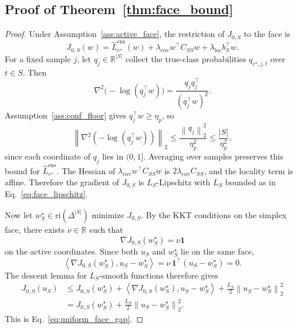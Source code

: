 \documentclass{article}
\theoremstyle{definition}
\newcommand{\RR}{\mathbb{R}}
\newcommand{\one}{\mathbf{1}}
\newcommand{\simplex}{\Delta}
\newcommand{\norm}[1]{\left\lVert #1 \right\rVert}
\newcommand{\inner}[2]{\left\langle #1, #2 \right\rangle}
\begin{document}
\subsection{Proof of Theorem~\ref{thm:face_bound}}

\begin{proof}
Under Assumption~\ref{ass:active_face}, the restriction of \(J_{0,S}\) to the face is
\[
J_{0,S}(w)=\widehat L_{e^\star}^{\mathrm{ens}}(w)+\lambda_{\mathrm{cov}}w^\top C_{SS}w+\lambda_{\mathrm{loc}}b_S^\top w.
\]
For a fixed sample \(j\), let \(q_j\in\RR^{|S|}\) collect the true-class probabilities \(q_{e^\star,j,t}\) over \(t\in S\). Then
\[
\nabla^2\!\big(-\log(q_j^\top w)\big)=\frac{q_j q_j^\top}{(q_j^\top w)^2}.
\]
Assumption~\ref{ass:conf_floor} gives \(q_j^\top w\ge \eta_p\), so
\[
\norm{\nabla^2(-\log(q_j^\top w))}_2 \le \frac{\norm{q_j}_2^2}{\eta_p^2}\le \frac{|S|}{\eta_p^2},
\]
since each coordinate of \(q_j\) lies in \((0,1]\). Averaging over samples preserves this bound for \(\widehat L_{e^\star}^{\mathrm{ens}}\). The Hessian of \(\lambda_{\mathrm{cov}}w^\top C_{SS}w\) is \(2\lambda_{\mathrm{cov}}C_{SS}\), and the locality term is affine. Therefore the gradient of \(J_{0,S}\) is \(L_S\)-Lipschitz with \(L_S\) bounded as in Eq.~\eqref{eq:face_lipschitz}.

Now let \(w_S^\star\in \mathrm{ri}(\simplex^{|S|})\) minimize \(J_{0,S}\). By the KKT conditions on the simplex face, there exists \(\nu\in\RR\) such that
\[
\nabla J_{0,S}(w_S^\star)=\nu \one
\]
on the active coordinates. Since both \(u_S\) and \(w_S^\star\) lie on the same face,
\[
\inner{\nabla J_{0,S}(w_S^\star)}{u_S-w_S^\star}
=
\nu\,\one^\top(u_S-w_S^\star)=0.
\]
The descent lemma for \(L_S\)-smooth functions therefore gives
\[
\begin{aligned}
J_{0,S}(u_S)
&\le
J_{0,S}(w_S^\star)
+
\inner{\nabla J_{0,S}(w_S^\star)}{u_S-w_S^\star}
+
\frac{L_S}{2}\norm{u_S-w_S^\star}_2^2 \\
&=
J_{0,S}(w_S^\star)
+
\frac{L_S}{2}\norm{u_S-w_S^\star}_2^2.
\end{aligned}
\]
This is Eq.~\eqref{eq:uniform_face_gap}.
\end{proof}
\end{document}
